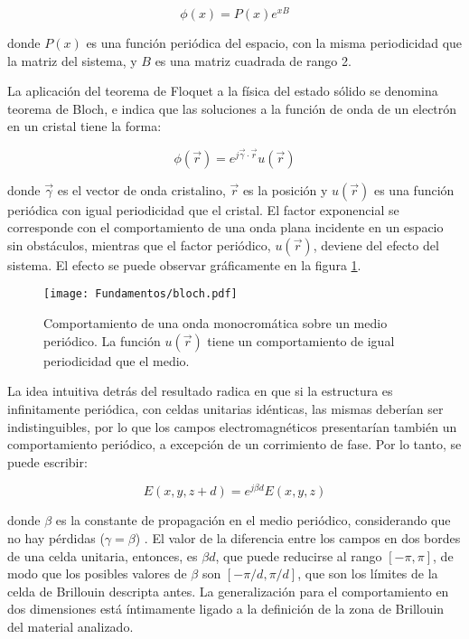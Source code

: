 \begin{equation}
	\phi(x) = P(x) e^{xB}
\end{equation}

donde $P(x)$ es una función periódica del espacio, con la misma periodicidad que la matriz del sistema, y $B$ es una matriz cuadrada de rango 2.

La aplicación del teorema de Floquet a la física del estado sólido se denomina teorema de Bloch, e indica que las soluciones a la función de onda de un electrón en un cristal tiene la forma:

\begin{equation}
\phi(\vec{r}) = e^{j\vec{\gamma} \cdot \vec{r}} u(\vec{r})
\end{equation}

donde $\vec{\gamma}$ es el vector de onda cristalino, $\vec{r}$ es la posición y $u(\vec{r})$ es una función periódica con igual periodicidad que el cristal. El factor exponencial se corresponde con el comportamiento de una onda plana incidente en un espacio sin obstáculos, mientras que el factor periódico, $u(\vec{r})$, deviene del efecto del sistema. El efecto se puede observar gráficamente en la figura \ref{fig:bloch-periodico-1d}.

\begin{figure}[htp]
	\centering
	\texttt{[image: Fundamentos/bloch.pdf]}
	\caption{Comportamiento de una onda monocromática sobre un medio periódico. La función $u(\vec{r})$ tiene un comportamiento de igual periodicidad que el medio.}
	\label{fig:bloch-periodico-1d}
\end{figure}

La idea intuitiva detrás del resultado radica en que si la estructura es infinitamente periódica, con celdas unitarias idénticas, las mismas deberían ser indistinguibles, por lo que los campos electromagnéticos presentarían también un comportamiento periódico, a excepción de un corrimiento de fase. Por lo tanto, se puede escribir:

\begin{equation}
	\label{eq:comportamiento-periodico-campo-bloch}
	E(x,y,z+d) = e^{j \beta d} E(x,y,z)
\end{equation}

donde $\beta$ es la constante de propagación en el medio periódico, considerando que no hay pérdidas ($\gamma = \beta$) \cite{Capolino:TheoryPhenomenaMetamaterials}. El valor de la diferencia entre los campos en dos bordes de una celda unitaria, entonces, es $\beta d$, que puede reducirse al rango $[-\pi,\pi]$, de modo que los posibles valores de $\beta$ son $[-\pi/d,\pi/d]$, que son los límites de la celda de Brillouin descripta antes. La generalización para el comportamiento en dos dimensiones está íntimamente ligado a la definición de la zona de Brillouin del material analizado.

